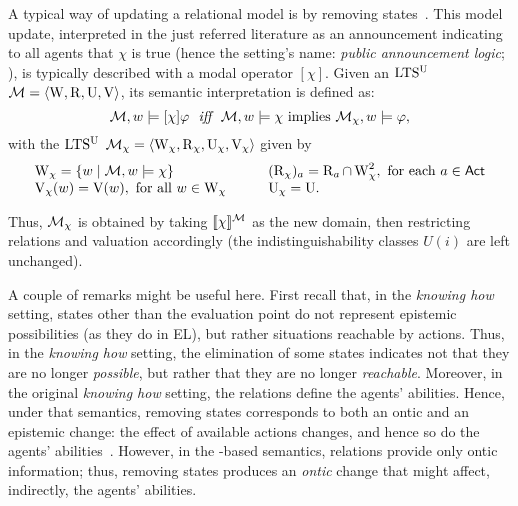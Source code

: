 

A typical way of updating a relational model is by removing states~\cite{Plaza89:lopc,DELbook}. This model update, interpreted in the just referred literature as an announcement indicating to all agents that $\chi$ is true (hence the setting's name: \emph{public announcement logic}; \PAL), is typically described with a modal operator $[\chi]$. Given an $\textup{LTS$^\text{\textup{U}}$}$ $\mathcal{M}=\langle \operatorname{W},\operatorname{R},\operatorname{U},\operatorname{V} \rangle$, its semantic interpretation is defined as:
\[
\modults,w\models[\chi]\varphi \ \ \iff \ \  \modults,w\models\chi \mbox{ implies } \modults_{\chi},w\models\varphi,
\]
with the $\textup{LTS$^\text{\textup{U}}$}$ $\mathcal{M}_\chi=\langle \operatorname{W}_\chi,\operatorname{R}_\chi,\operatorname{U}_\chi,\operatorname{V}_\chi \rangle$ given by
\[
\begin{array}{l@{\quad \quad \quad }l}
\W_\chi = \set{w \mid \modults,w\models\chi} & (\R_\chi)_a = \R_a \cap \W_\chi^2, \mbox{ for each } a\in\ACT \\
\V_\chi(w) = \V(w), \mbox{ for all } w\in\W_\chi & \Unc_\chi = {\Unc}.
\end{array}	
\]

Thus, $\mathcal{M}_\chi$ is obtained by taking $\llbracket \chi \rrbracket^{\mathcal{M}}$ as the new domain, then restricting relations and valuation accordingly (the indistinguishability classes $U(i)$ are left unchanged). 

A couple of remarks might be useful here. First recall that, in the \emph{knowing how} setting, states other than the evaluation point do not represent epistemic possibilities (as they do in EL), but rather situations reachable by actions. Thus, in the \emph{knowing how} setting, the elimination of some states indicates not that they are no longer \emph{possible}, but rather that they are no longer \emph{reachable}. Moreover, in the original \emph{knowing how} setting, the relations define the agents' abilities. Hence, under that semantics, removing states corresponds to both an ontic and an epistemic change: the effect of available actions changes, and hence so do the agents' abilities~\cite{Wang2016}. However, in the \ults-based semantics, relations provide only ontic information; thus, removing states produces an \emph{ontic} change that might affect, indirectly, the agents' abilities.

